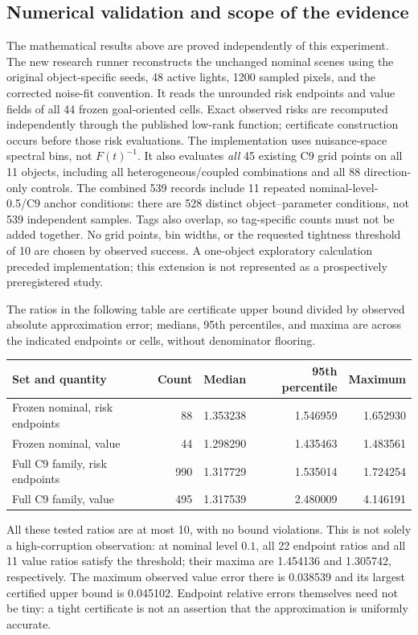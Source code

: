 \subsection{Numerical validation and scope of the evidence}
\label{subsec:m14-evidence}

The mathematical results above are proved independently of this experiment.
The new research runner reconstructs the unchanged nominal scenes using the
original object-specific seeds, 48 active lights, 1200 sampled pixels, and
the corrected noise-fit convention.  It reads the unrounded risk endpoints
and value fields of all 44 frozen goal-oriented cells.  Exact observed risks
are recomputed independently through the published low-rank function;
certificate construction occurs before those risk evaluations.
The implementation uses nuisance-space spectral bins, not $F(t)^{-1}$.
It also evaluates \emph{all} 45 existing C9 grid points on all 11 objects,
including all heterogeneous/coupled combinations and all 88 direction-only
controls.  The combined 539 records include 11 repeated nominal-level-0.5/C9
anchor conditions: there are 528 distinct object--parameter conditions, not
539 independent samples.  Tags also overlap, so tag-specific counts must
not be added together.
No grid points, bin widths, or the requested tightness threshold of 10 are
chosen by observed success.  A one-object exploratory calculation preceded
implementation; this extension is not represented as a prospectively
preregistered study.

The ratios in the following table are certificate upper bound divided by
observed absolute approximation error; medians, 95th percentiles, and maxima
are across the indicated endpoints or cells, without denominator flooring.
\begin{center}
\begin{tabular}{lrrrr}
\hline
Set and quantity & Count & Median & 95th percentile & Maximum\\
\hline
Frozen nominal, risk endpoints & 88 & 1.353238 & 1.546959 & 1.652930\\
Frozen nominal, value & 44 & 1.298290 & 1.435463 & 1.483561\\
Full C9 family, risk endpoints & 990 & 1.317729 & 1.535014 & 1.724254\\
Full C9 family, value & 495 & 1.317539 & 2.480009 & 4.146191\\
\hline
\end{tabular}
\end{center}
All these tested ratios are at most 10, with no bound violations.
This is not solely a high-corruption observation: at nominal level $0.1$,
all 22 endpoint ratios and all 11 value ratios satisfy the threshold;
their maxima are 1.454136 and 1.305742, respectively.  The maximum observed
value error there is 0.038539 and its largest certified upper bound is
0.045102.  Endpoint relative errors themselves need not be tiny: a tight
certificate is not an assertion that the approximation is uniformly accurate.

